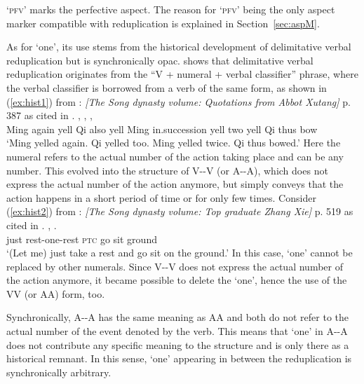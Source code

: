  `\textsc{pfv}' marks the perfective aspect.
The reason for  `\textsc{pfv}' being the only aspect marker compatible with reduplication is explained in Section~\ref{sec:aspM}.

As for  `one', its use stems from the historical development of delimitative verbal reduplication but is synchronically opac.
\citet[13--15]{Zhang2000} shows that delimitative verbal reduplication originates from the ``V + numeral + verbal classifier'' phrase,
where the verbal classifier is borrowed from a verb of the same form, as shown in (\ref{ex:hist1}) from  :    \textit{[The Song dynasty volume: Quotations from Abbot Xutang]} p. 387 as cited in \citet[12]{Zhang2000}.
\ea\label{ex:hist1}
\gll {}  ,   ,     ,   \\
Ming again yell Qi also yell Ming in.succession yell two yell Qi thus bow\\
\glt `Ming yelled again. Qi yelled too. Ming yelled twice. Qi thus bowed.'
\z
Here the numeral refers to the actual number of the action taking place
and can be any number.
This evolved into the structure of V--V (or A--A), which does not express the actual number of the action anymore,
but simply conveys that the action happens in a short period of time or for only few times. 
Consider (\ref{ex:hist2}) from  :    \textit{[The Song dynasty volume: Top graduate Zhang Xie]} p. 519 as cited in \citet[13]{Zhang2000}.
\ea\label{ex:hist2}
\gll {}  ,   .\\
just rest-one-rest \textsc{ptc} go sit ground\\
\glt `(Let me) just take a rest and go sit on the ground.'
\z
In this case,  `one' cannot be replaced by other numerals.
Since V--V does not express the actual number of the action anymore,
it became possible to delete the  `one',
hence the use of the VV (or AA) form, too.

Synchronically, A--A has the same meaning as AA and both do not refer to the actual number of the event denoted by the verb.
This means that  `one' in A--A does not contribute any specific meaning to the structure
and is only there as a historical remnant.
In this sense,   `one' appearing in between the reduplication is synchronically arbitrary. %

